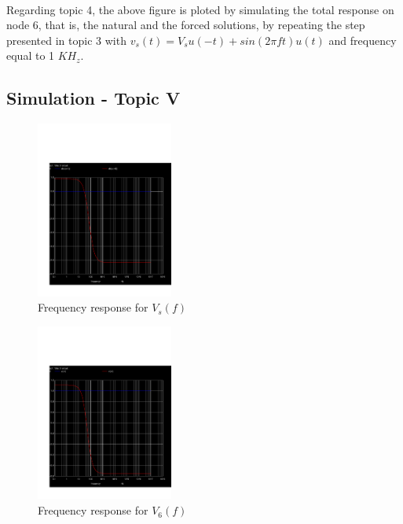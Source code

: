 \paragraph{}
Regarding topic 4, the above figure is ploted by simulating the total response on node 6, that is, the natural and the forced solutions, by repeating the step presented in topic 3 with $v_s(t) = V_s u(-t) + sin(2 \pi ft) u(t)$ and frequency equal to 1 $KH_z$. 


\subsection{Simulation - Topic V}
\label{subsec:sim_fifth}

\begin{figure}[H] \centering
\includegraphics[width=0.4\textwidth]{acm.pdf}
\caption{Frequency response for $V_s(f)$}
\label{fig:$V_s(f)$}
\end{figure}


\begin{figure}[H] \centering
\includegraphics[width=0.4\textwidth]{acp.pdf}
\caption{Frequency response for $V_6(f)$}
\label{fig:$V_6(f)$}
\end{figure}

